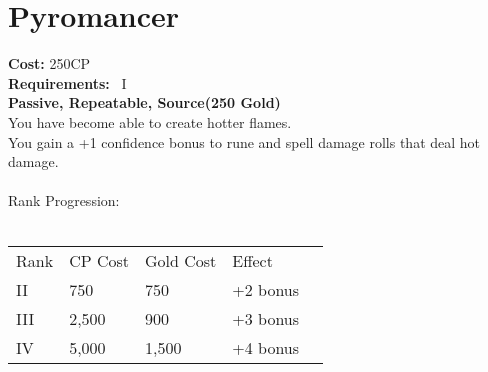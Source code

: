 \section{Pyromancer}\label{perk:pyromancer}
\textbf{Cost:} 250CP\\
\textbf{Requirements:}~ I\\
\textbf{Passive, Repeatable, Source(250 Gold)}\\
You have become able to create hotter flames.\\
You gain a +1 confidence bonus to rune and spell damage rolls that deal hot damage.\\
\\
Rank Progression:\\
\\
\begin{tabular}{l | l | l | l | l}
    Rank & CP Cost & Gold Cost &  Effect\\
    II & 750 & 750 & +2 bonus\\
    III & 2,500 & 900 & +3 bonus\\
    IV & 5,000 & 1,500 & +4 bonus\\
\end{tabular}